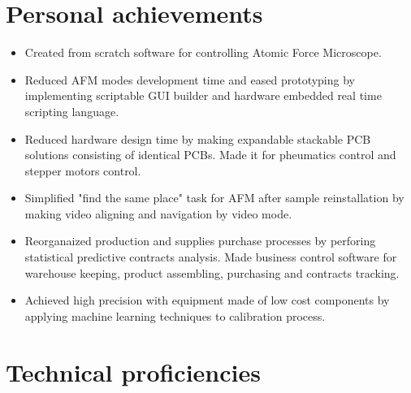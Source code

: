 \documentclass{sb_cv}
\begin{document}
\section{Personal achievements}
\begin{itemize}
\item Created from scratch software for controlling Atomic Force Microscope.
\item Reduced AFM modes development time and eased prototyping by implementing scriptable GUI builder and hardware embedded real time scripting language.
\item Reduced hardware design time by making expandable stackable PCB solutions consisting of identical PCBs. Made it for pheumatics control and stepper motors control.
\item Simplified "find the same place" task for AFM after sample reinstallation by making video aligning and navigation by video mode.
\item Reorganaized production and supplies purchase processes by perforing statistical predictive contracts analysis. Made business control software for warehouse keeping, product assembling, purchasing and contracts tracking.
\item Achieved high precision with equipment made of low cost components by applying machine learning techniques to calibration process.
\end{itemize}



\vspace*{-3mm}
\section{Technical proficiencies}
\end{document}
